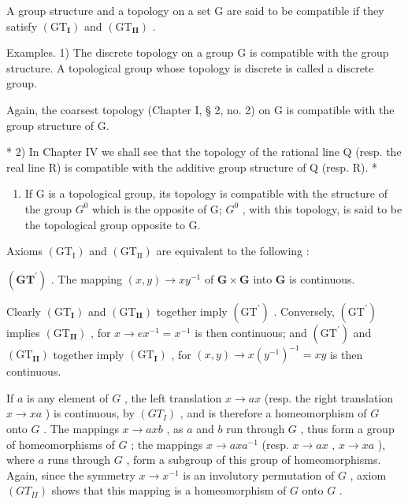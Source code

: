 A group structure and a topology on a set G are said to be compatible if they satisfy \((\mathrm{GT}_{\mathbf{I}})\) and \((\mathrm{GT}_{\mathbf{II}})\) .

Examples. 1) The discrete topology on a group G is compatible with the group structure. A topological group whose topology is discrete is called a discrete group.

Again, the coarsest topology (Chapter I, § 2, no. 2) on G is compatible with the group structure of G.

* 2) In Chapter IV we shall see that the topology of the rational line Q (resp. the real line R) is compatible with the additive group structure of Q (resp. R). *

\begin{enumerate}
\def\labelenumi{\arabic{enumi})}
\setcounter{enumi}{2}
\tightlist
\item
  If G is a topological group, its topology is compatible with the structure of the group \(G^{0}\) which is the opposite of G; \(G^{0}\) , with this topology, is said to be the topological group opposite to G.
\end{enumerate}

Axioms \((\mathrm{GT}_{\mathrm{I}})\) and \((\mathrm{GT}_{\mathrm{II}})\) are equivalent to the following :

\((\mathbf{GT}^{\prime})\) . The mapping \((x,y)\to xy^{-1}\) of \(\mathbf{G}\times \mathbf{G}\) into \(\mathbf{G}\) is continuous.

Clearly \((\mathrm{GT}_{\mathbf{I}})\) and \((\mathrm{GT}_{\mathbf{II}})\) together imply \((\mathrm{GT}^{\prime})\) . Conversely, \((\mathrm{GT}^{\prime})\) implies \((\mathrm{GT}_{\mathbf{II}})\) , for \(x \to ex^{-1} = x^{-1}\) is then continuous; and \((\mathrm{GT}^{\prime})\) and \((\mathrm{GT}_{\mathbf{II}})\) together imply \((\mathrm{GT}_{\mathbf{I}})\) , for \((x, y) \to x(y^{-1})^{-1} = xy\) is then continuous.

If \(a\) is any element of \(G\) , the left translation \(x \to ax\) (resp. the right translation \(x \to xa\) ) is continuous, by \((GT_{I})\) , and is therefore a homeomorphism of \(G\) onto \(G\) . The mappings \(x \to axb\) , as \(a\) and \(b\) run through \(G\) , thus form a group of homeomorphisms of \(G\) ; the mappings \(x \to axa^{-1}\) (resp. \(x \to ax\) , \(x \to xa\) ), where \(a\) runs through \(G\) , form a subgroup of this group of homeomorphisms. Again, since the symmetry \(x \to x^{-1}\) is an involutory permutation of \(G\) , axiom \((GT_{II})\) shows that this mapping is a homeomorphism of \(G\) onto \(G\) .

